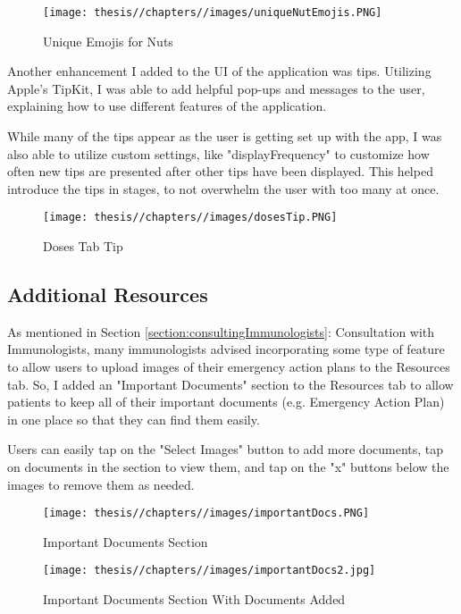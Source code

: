 \begin{figure} [H]
    \centering
    \texttt{[image: thesis//chapters//images/uniqueNutEmojis.PNG]}
    \caption{Unique Emojis for Nuts}
    \label{fig:enter-label}
\end{figure}

Another enhancement I added to the UI of the application was tips. Utilizing Apple's TipKit, I was able to add helpful pop-ups and messages to the user, explaining how to use different features of the application.

While many of the tips appear as the user is getting set up with the app, I was also able to utilize custom settings, like "displayFrequency" to customize how often new tips are presented after other tips have been displayed. This helped introduce the tips in stages, to not overwhelm the user with too many at once.

\begin{figure} [H]
    \centering
    \texttt{[image: thesis//chapters//images/dosesTip.PNG]}
    \caption{Doses Tab Tip}
    \label{fig:enter-label}
\end{figure}

\subsection{Additional Resources}

As mentioned in Section \ref{section:consultingImmunologists}: Consultation with Immunologists, many immunologists advised incorporating some type of feature to allow users to upload images of their emergency action plans to the Resources tab. So, I added an "Important Documents" section to the Resources tab to allow patients to keep all of their important documents (e.g. Emergency Action Plan) in one place so that they can find them easily.

Users can easily tap on the "Select Images" button to add more documents, tap on documents in the section to view them, and tap on the "x" buttons below the images to remove them as needed.

\begin{figure} [H]
    \centering
    \texttt{[image: thesis//chapters//images/importantDocs.PNG]}
    \caption{Important Documents Section}
    \label{fig:enter-label}
\end{figure}

\begin{figure} [H]
    \centering
    \texttt{[image: thesis//chapters//images/importantDocs2.jpg]}
    \caption{Important Documents Section With Documents Added}
    \label{fig:enter-label}
\end{figure}

